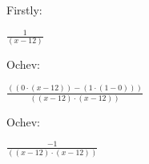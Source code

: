 \documentclass[12pt]{article}
\begin{document}
Firstly: 
\begin{center}
$ \frac{1}{(x - 12)} $
\end{center}
Ochev: 
\begin{center}
$ \frac{((0 \cdot (x - 12)) - (1 \cdot (1 - 0)))}{((x - 12) \cdot (x - 12))} $
\end{center}
Ochev: 
\begin{center}
$ \frac{-1}{((x - 12) \cdot (x - 12))} $
\end{center}
\end{document}
